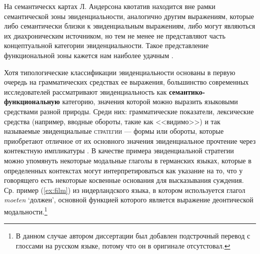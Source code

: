 На семантическх картах Л. Андерсона квотатив находится вне рамки семантической зоны эвиденциальности, аналогично другим выражениям, которые либо семантически близки к эвиденциальным выражениям, либо могут являються их диахроническим источником, но тем не менее не представляют часть концептуальной категории эвиденциальности. Такое представление функциональной зоны кажется нам наиболее удачным \citep[307]{anderson1986}.
\par Хотя типологические классификации эвиденциальности основаны в первую очередь на грамматических средствах ее выражения, большинство современных исследователей рассматривают эвиденциальность как \textbf{семантико-функциональную} категорию, значения которой можно выразить языковыми средствами разной природы. Среди них: грамматические показатели, лексические средства (например, вводные обороты, такие как <<видимо>>) и так называемые эвиденциальные \textsc{стратегии} --- формы или обороты, которые приобретают отличное от их основного значения эвиденциальное прочтение через контекстную импликатуры \citep[105--152]{aikhenvald2004}. \color{black}
В качестве примера эвиденциальной стратегии можно упомянуть некоторые модальные глаголы в германских языках, которые в определенных контекстах могут интерпретироваться как указание на то, что у говорящего есть некоторые косвенные основания для высказывания суждения. Ср. пример (\ref{ex:film}) из нидерландского языка, в котором используется глагол \textit{moeten} `должен', основной функцией которого является выражение деонтической модальности.\footnote{В данном случае автором диссертации был добавлен подстрочный перевод с глоссами на русском языке, потому что он в оригинале отсутстовал.} 



